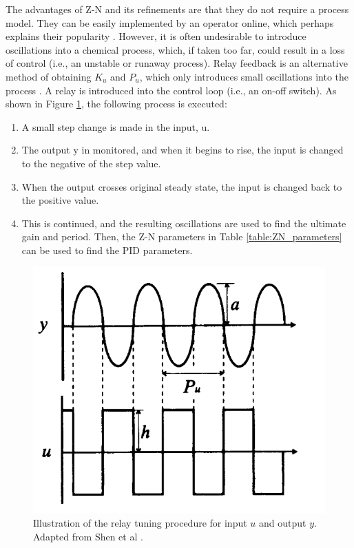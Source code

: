 The advantages of Z-N and its refinements\cite{Hang1991} are that they do not require a process model. They can be easily implemented by an operator online, which perhaps explains their popularity \cite{KiamHeongAng2005}. However, it is often undesirable to introduce oscillations into a chemical process, which, if taken too far, could result in a loss of control (i.e., an unstable or runaway process). Relay feedback is an alternative method of obtaining $K_u$ and $P_u$, which only introduces small oscillations into the process \cite{Shen1994}. A relay is introduced into the control loop (i.e., an on-off switch).  As shown in Figure \ref{relay_tuning}, the following process is executed: 
\begin{enumerate}
    \item A small step change is made in the input, u.
    \item The output y in monitored, and when it begins to rise, the input is changed to the negative of the step value.
    \item When the output crosses original steady state, the input is changed back to the positive value.
    \item 	This is continued, and the resulting oscillations are used to find the ultimate gain and period. Then, the Z-N parameters in Table \ref{table:ZN_parameters} can be used to find the PID parameters. 
\end{enumerate}

\begin{figure}[bt]
  \centering
  \includegraphics[scale=0.3]{gfx/Chapter05/relay_tuning.png}
  \caption{Illustration of the relay tuning procedure for input $u$ and output $y$. Adapted from Shen et al \cite{Shen1994}.}
  \label{relay_tuning}
\end{figure}

